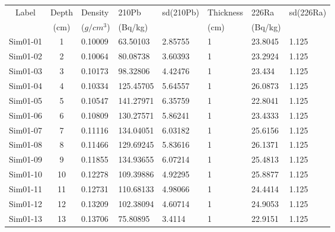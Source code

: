 \documentclass [10pt] {article}
\begin{document}
\begin{table}[H]
	\begin{tabular}{c|cllllll}
		Label    & Depth & Density  & 210Pb & sd(210Pb) & Thickness& 226Ra  & sd(226Ra) \\
		& (cm) &($g/cm^3$) &(Bq/kg)& & (cm) & (Bq/kg)&\\
		\hline 
		Sim01-01 & 1          & 0.10009                         & 63.50103      & 2.85755   & 1              & 23.8045       & 1.125     \\
		Sim01-02 & 2          & 0.10064                         & 80.08738      & 3.60393   & 1              & 23.2924       & 1.125     \\
		Sim01-03 & 3          & 0.10173                         & 98.32806      & 4.42476   & 1              & 23.434        & 1.125     \\
		Sim01-04 & 4          & 0.10334                         & 125.45705     & 5.64557   & 1              & 26.0873       & 1.125     \\
		Sim01-05 & 5          & 0.10547                         & 141.27971     & 6.35759   & 1              & 22.8041       & 1.125     \\
		Sim01-06 & 6          & 0.10809                         & 130.27571     & 5.86241   & 1              & 23.4333       & 1.125     \\
		Sim01-07 & 7          & 0.11116                         & 134.04051     & 6.03182   & 1              & 25.6156       & 1.125     \\
		Sim01-08 & 8          & 0.11466                         & 129.69245     & 5.83616   & 1              & 26.1371       & 1.125     \\
		Sim01-09 & 9          & 0.11855                         & 134.93655     & 6.07214   & 1              & 25.4813       & 1.125     \\
		Sim01-10 & 10         & 0.12278                         & 109.39886     & 4.92295   & 1              & 25.8877       & 1.125     \\
		Sim01-11 & 11         & 0.12731                         & 110.68133     & 4.98066   & 1              & 24.4414       & 1.125     \\
		Sim01-12 & 12         & 0.13209                         & 102.38094     & 4.60714   & 1              & 24.9053       & 1.125     \\
		Sim01-13 & 13         & 0.13706                         & 75.80895      & 3.4114    & 1              & 22.9151       & 1.125     \\

\end{tabular}
\end{table}
\end{document}
